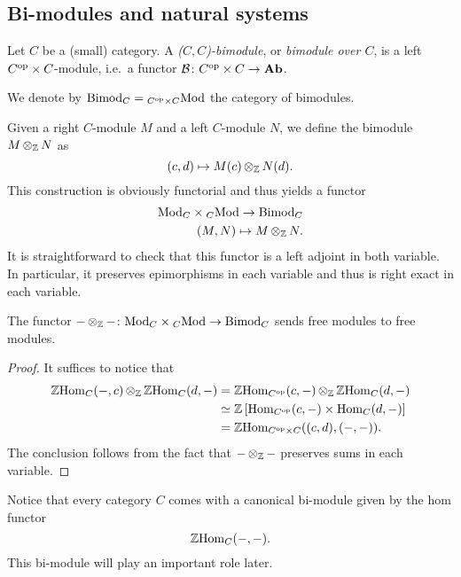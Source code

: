 \documentclass{amsart}
\newcommand{\B}{\mathcal{B}}
\newcommand{\Bimod}[1]{\mathrm{Bimod}_{#1}}
\renewcommand{\homset}[3]{\mathrm{Hom}_{#1}(#2,#3)}
\begin{document}
\subsection{Bi-modules and natural systems}
\begin{definition}
  Let $C$ be a (small) category. A \emph{($C,C$)\nbd-bimodule}, or
  \emph{bimodule over $C$}, is a left $C^{{\mathrm{op}}} \times C$\nbd-module,
  i.e.\ a functor $\B \colon C^{\op} \times C \to \Ab$.

  \end{definition}
  We denote by
  $\Bimod{C}=\LMod{C^{\op}\times C}$ the category of bimodules.
\begin{paragr}
  Given a right $C$\nbd-module $M$ and a left $C$\nbd-module $N$, we
  define the bimodule $M\operatorname{\otimes}_{\mathbb Z}N$ as 
  \[
    (c,d) \mapsto M(c)\operatorname{\otimes}_{\mathbb Z} N(d).
  \]
  This construction is obviously functorial and thus yields a functor
  \[
    \begin{aligned}
      \RMod{C}\times \LMod{C} \to \Bimod{C}\\
      (M,N) \mapsto M\tens_{\Z} N.
    \end{aligned}
  \]
  It is straightforward to check that this functor is a left adjoint
  in both variable. In particular, it preserves epimorphisms in each
  variable and thus is right exact in each variable. 
\end{paragr}
\begin{lemma}\label{tensfreemod}
  The functor $-\tens_{\Z}- \colon\RMod{C}\times \LMod{C} \to
  \Bimod{C}$ sends free modules to free modules.
\end{lemma}
\begin{proof}
  It suffices to notice that
  \[
    \begin{aligned}
      \Z\homset{C}{-}{c}\tens_{\Z}\Z\homset{C}{d}{-}&=\Z\homset{C^{\op}}{c}{-}\tens_{\Z}\Z\homset{C}{d}{-}\\
                                                   &\simeq\Z\left[\homset{C^{\op}}{c}{-}\times\homset{C}{d}{-}\right]\\
      &=\Z\homset{C^{\op}\times C}{(c,d)}{(-,-)}.      
    \end{aligned}
  \]
  The conclusion follows from the fact that $-\operatorname{\otimes}_{\mathbb Z}-$ preserves
  sums in each variable. 
\end{proof}
\begin{paragr}
  Notice that every category $C$ comes with a canonical bi-module
  given by the hom functor
  \[
    \Z \homset{C}{-}{-}.
  \]
  This bi-module will play an important role later.
\end{paragr}
\end{document}
